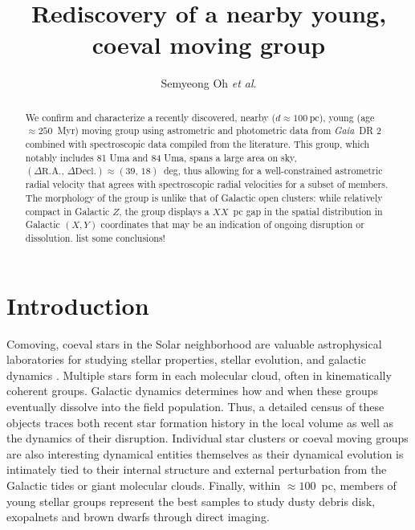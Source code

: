 \documentclass[modern,letterpaper]{aastex61}
\newcommand{\project}[1]{\textsl{#1}}
\newcommand{\gaia}{\project{Gaia}}
\newcommand{\etal}{\textit{et al}.}
\newcommand{\todo}[1]{{\color{crimson}#1}}
\newcommand{\groupDistanceEstimate}{\ensuremath{100~\mathrm{pc}}}
\begin{document}
\sloppy\sloppypar\raggedbottom\frenchspacing %

\title{
  Rediscovery of a nearby young, coeval moving group
}

\author[0000-0001-7790-5308]{Semyeong Oh \etal}


\begin{abstract}

  We confirm and characterize a recently discovered, nearby ($d \approx \groupDistanceEstimate$), young (age$\approx 250$~Myr) moving group using astrometric and photometric data from \gaia\ DR 2 combined with spectroscopic data compiled from the literature.
  This group, which notably includes 81 Uma and 84 Uma, spans a large area
  on sky, $(\Delta\mathrm{R.A.},\,\Delta\mathrm{Decl.})\approx(39,\,18)$~deg,
  thus allowing for a well-constrained astrometric radial velocity that agrees with spectroscopic radial velocities for a subset of members.
  The morphology of the group is unlike that of Galactic open clusters: while relatively compact in Galactic $Z$, the group displays a $XX$~pc gap in the spatial distribution in Galactic $(X, Y)$ coordinates that may be an indication of ongoing disruption or dissolution.
  \todo{list some conclusions!}

\end{abstract}

\section{Introduction} %
\label{sec:introduction}

Comoving, coeval stars in the Solar neighborhood are valuable astrophysical
laboratories for studying stellar properties, stellar evolution, and galactic
dynamics \citep[e.g.,][]{2018arXiv180409378G,2018MNRAS.tmp.1228M}.
Multiple stars form in each molecular cloud, often in kinematically coherent
groups.
Galactic dynamics determines how and when these groups eventually dissolve into the field population.
Thus, a detailed census of these objects traces both recent star formation
history in the local volume as well as the dynamics of their disruption.
Individual star clusters or coeval moving groups are also interesting dynamical
entities themselves as their dynamical evolution is intimately tied to their
internal structure and external perturbation from the Galactic tides or giant
molecular clouds.
Finally, within $\approx 100$~pc, members of young stellar groups represent the
best samples to study dusty debris disk, exopalnets and brown dwarfs through
direct imaging.
\end{document}
